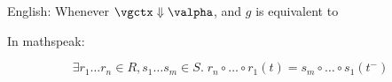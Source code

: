 \documentclass[]{article}
\begin{document}

English: Whenever $\vgctx \Downarrow \valpha$, and $g$ is equivalent to 

In mathspeak: 

\[
    \exists r_{1} \dots r_{n} \in R, s_{1} \dots s_{m} \in S .\;
  r_{n} \circ \dots \circ r_{1}(t) = s_{m} \circ \dots \circ s_{1}(t^{-})
  \]

\end{document}
